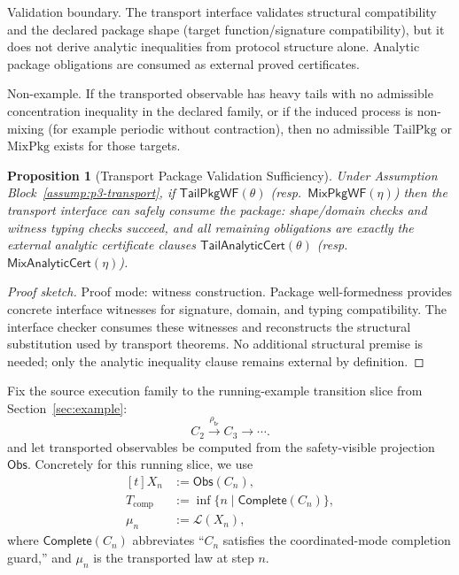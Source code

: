 \documentclass[a4paper,10pt,twocolumn,english]{article}
\numberwithin{equation}{section}
\theoremstyle{paperdef}
\theoremstyle{paperplain}
\newtheorem{proposition}[definition]{Proposition}
\theoremstyle{paperdef}
\theoremstyle{paperremark}
\theoremstyle{paperdef}
\newcommand{\Obs}{\ensuremath{\mathsf{Obs}}}
\begin{document}
Validation boundary. The transport interface validates structural compatibility
and the declared package shape (target function/signature compatibility), but it
does not derive analytic inequalities from protocol structure alone. Analytic
package obligations are consumed as external proved certificates.

Non-example. If the transported observable has heavy tails with no admissible
concentration inequality in the declared family, or if the induced process is
non-mixing (for example periodic without contraction), then no admissible
$\mathrm{TailPkg}$ or $\mathrm{MixPkg}$ exists for those targets.

\begin{proposition}[Transport Package Validation Sufficiency]
	\label{prop:p3-transport-pkg-validation}
	Under Assumption Block~\ref{assump:p3-transport}, if
	$\mathsf{TailPkgWF}(\theta)$ (resp.\ $\mathsf{MixPkgWF}(\eta)$) then the
	transport interface can safely consume the package: shape/domain checks and
	witness typing checks succeed, and all remaining obligations are exactly the
	external analytic certificate clauses
	$\mathsf{TailAnalyticCert}(\theta)$ (resp.\ $\mathsf{MixAnalyticCert}(\eta)$).
\end{proposition}

\begin{proof}[Proof sketch]
	Proof mode: witness construction. Package well-formedness provides concrete
	interface witnesses for signature, domain, and typing compatibility. The
	interface checker consumes these witnesses and reconstructs the structural
	substitution used by transport theorems. No additional structural premise is
	needed; only the analytic inequality clause remains external by definition.
\end{proof}

Fix the source execution family to the running-example transition slice from Section~\ref{sec:example}:
\begin{equation}
	C_2 \xrightarrow{\rho_{\mathsf{tr}}} C_3 \xrightarrow{} \cdots.
\end{equation}
and let transported observables be computed from the safety-visible projection $\Obs$.
Concretely for this running slice, we use
\begin{equation}
	\begin{aligned}[t]
		X_n   & := \Obs(C_n),                             \\
		T_{\mathrm{comp}}
		      & := \inf\{n \mid \mathsf{Complete}(C_n)\}, \\
		\mu_n & := \mathcal{L}(X_n),
	\end{aligned}
\end{equation}
where $\mathsf{Complete}(C_n)$ abbreviates ``$C_n$ satisfies the coordinated-mode completion guard,'' and $\mu_n$ is the transported law at step $n$.
\end{document}

